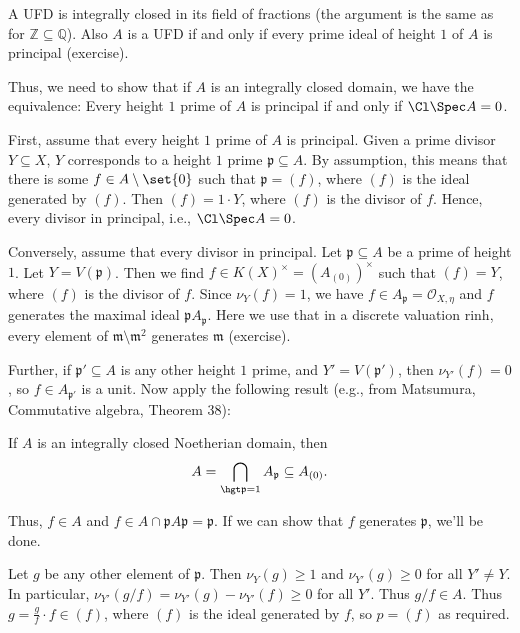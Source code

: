 A UFD is integrally closed in its field of fractions (the argument is the same
as for $\mathbb{Z} \subseteq \mathbb{Q}$). Also $A$ is a UFD if and only if
every prime ideal of height $1$ of $A$ is principal (exercise).

Thus, we need to show that if $A$ is an integrally closed domain, we have the
equivalence: Every height $1$ prime of $A$ is principal if and only if
 $\Cl \Spec A = 0$.

First, assume that every height $1$ prime of $A$ is principal. Given a prime
divisor $Y \subseteq X$, $Y$ corresponds to a height $1$ prime $\mathfrak{p} \subseteq A$.
By assumption, this means that there is some $f \in A\setminus\set{0}$ such
that $\mathfrak{p} = (f)$, where $(f)$ is the ideal generated by $(f)$. Then
$(f) = 1\cdot Y$, where $(f)$ is the divisor of $f$. Hence, every divisor
in principal, i.e., $\Cl\Spec A = 0$.

Conversely, assume that every divisor in principal. Let $\mathfrak{p} \subseteq A$
be a prime of height $1$. Let $Y = V(\mathfrak{p})$. Then we find $f \in K(X)^\times = (A_{(0)})^\times$
such that $(f) = Y$, where $(f)$ is the divisor of $f$. Since $\nu_Y(f) = 1$,
we have $f \in A_{\mathfrak{p}} = \mathcal{O}_{X, \eta}$ and $f$ generates the
maximal ideal $\mathfrak{p}A_{\mathfrak{p}}$. Here we use that in a discrete
valuation rinh, every element of $\mathfrak{m}\setminus \mathfrak{m}^2$ generates
$\mathfrak{m}$ (exercise).

Further, if $\mathfrak{p}' \subseteq A$ is any other height $1$ prime, and $Y' = V(\mathfrak{p}')$,
then $\nu_{Y'}(f) = 0$, so $f \in A_{\mathfrak{p}'}$ is a unit. Now apply the following
result (e.g., from Matsumura, Commutative algebra, Theorem 38):

If $A$ is an integrally closed Noetherian domain, then
\[ A = \bigcap_{\hgt\mathfrak{p} = 1} A_{\mathfrak{p}} \subseteq A_{(0)}. \]

Thus, $f \in A$ and $f \in A\cap \mathfrak{p}A \mathfrak{p} = \mathfrak{p}$.
If we can show that $f$ generates $\mathfrak{p}$, we'll be done.

Let $g$ be any other element of $\mathfrak{p}$. Then $\nu_Y(g) \geq 1$ and
$\nu_{Y'}(g) \geq 0$ for all $Y'\neq Y$. In particular, $\nu_{Y'}(g/f) = \nu_{Y'}(g) - \nu_{Y'}(f)\geq 0$ for
all $Y'$. Thus $g/f \in A$. Thus $g = \frac{g}{f}\cdot f \in (f)$, where $(f)$ is
the ideal generated by $f$, so $p = (f)$ as required.
